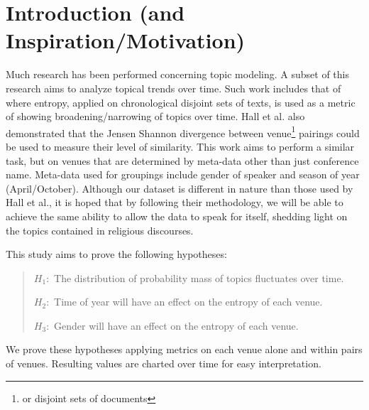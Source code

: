 \section {Introduction (and Inspiration/Motivation)}

Much research has been performed concerning topic modeling. A subset of this research aims to analyze topical trends over time. Such work includes that of \cite{hall-jurafsky-manning:2008:EMNLP} where entropy, applied on chronological disjoint sets of texts, is used as a metric of showing broadening/narrowing of topics over time. Hall et al. also demonstrated that the Jensen Shannon divergence between venue\footnote{or disjoint sets of documents} pairings could be used to measure their level of similarity. This work aims to perform a similar task, but on venues that are determined by meta-data other than just conference name. Meta-data used for groupings include gender of speaker and season of year (April/October). Although our dataset is different in nature than those used by Hall et al., it is hoped that by following their methodology, we will be able to achieve the same ability to allow the data to speak for itself, shedding light on the topics contained in religious discourses.

This study aims to prove the following hypotheses:
	\begin{quote}
		$H_{1}:$ The distribution of probability mass of topics fluctuates over time. 
		
		$H_{2}:$ Time of year will have an effect on the entropy of each venue.

		$H_{3}:$ Gender will have an effect on the entropy of each venue.

	\end{quote}

We prove these hypotheses applying metrics on each venue alone and within pairs of venues. Resulting values are charted over time for easy interpretation.
